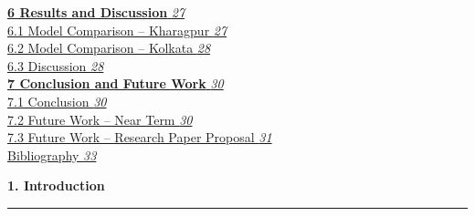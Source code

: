 \documentclass[12pt,a4paper]{report}
\begin{document}
\hyperlink{sec:ch6}{\textbf{6 \hspace{0.3cm} Results and Discussion} \dotfill \textit{27}}\\
\hspace*{0.8cm}\hyperlink{sec:s61}{6.1 \hspace{0.3cm} Model Comparison -- Kharagpur \dotfill \textit{27}}\\
\hspace*{0.8cm}\hyperlink{sec:s62}{6.2 \hspace{0.3cm} Model Comparison -- Kolkata \dotfill \textit{28}}\\
\hspace*{0.8cm}\hyperlink{sec:s63}{6.3 \hspace{0.3cm} Discussion \dotfill \textit{28}}\\[0.3cm]

\hyperlink{sec:ch7}{\textbf{7 \hspace{0.3cm} Conclusion and Future Work} \dotfill \textit{30}}\\
\hspace*{0.8cm}\hyperlink{sec:s71}{7.1 \hspace{0.3cm} Conclusion \dotfill \textit{30}}\\
\hspace*{0.8cm}\hyperlink{sec:s72}{7.2 \hspace{0.3cm} Future Work -- Near Term \dotfill \textit{30}}\\
\hspace*{0.8cm}\hyperlink{sec:s73}{7.3 \hspace{0.3cm} Future Work -- Research Paper Proposal \dotfill \textit{31}}\\[0.3cm]

\hyperlink{sec:bib}{Bibliography \dotfill \textit{33}}\\

\setcounter{page}{1}

\newpage
\thispagestyle{plain}
\begin{center}
    \hypertarget{sec:ch1}{}%
    {\Large \textbf{1. Introduction}}\\[0.3cm]
    \noindent\rule{\linewidth}{0.6pt}\\[0.8cm]
\end{center}
\setlength{\parindent}{1cm}
\setlength{\parskip}{6pt}
\justifying
\end{document}
